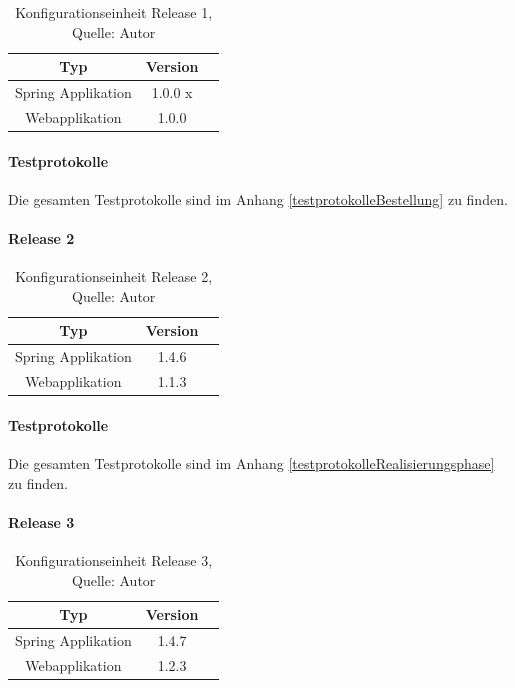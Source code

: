 \begin{table}[H]
\setlength\extrarowheight{2pt} %
\begin{tabularx}{\textwidth}{|C|C|C|}
\hline
\textbf{Typ} &  \textbf{Version}  \\
\hline
Spring Applikation & 1.0.0 x\\
\hline
Webapplikation  & 1.0.0\\

\hline
\end{tabularx}
\caption{ \label{tbl: Konfigurationseinheit Release 1}Konfigurationseinheit Release 1, Quelle: Autor}
\end{table}

\paragraph{Testprotokolle}
Die gesamten Testprotokolle sind im Anhang \ref{testprotokolleBestellung} zu finden. 

\paragraph{Release 2}

\begin{table}[H]
	\setlength\extrarowheight{2pt} %
	\begin{tabularx}{\textwidth}{|C|C|C|}
		\hline
		\textbf{Typ} &  \textbf{Version}  \\
		\hline
		Spring Applikation & 1.4.6\\
		\hline
		Webapplikation  & 1.1.3\\
		\hline
	\end{tabularx}
	\caption{ \label{tbl: Konfigurationseinheit Release 2}Konfigurationseinheit Release 2, Quelle: Autor}
\end{table}

\paragraph{Testprotokolle}
Die gesamten Testprotokolle sind im Anhang \ref{testprotokolleRealisierungsphase} zu finden. 
\paragraph{Release 3}

\begin{table}[H]
	\setlength\extrarowheight{2pt} %
	\begin{tabularx}{\textwidth}{|C|C|C|}
		\hline
		\textbf{Typ} &  \textbf{Version}  \\
		\hline
		Spring Applikation & 1.4.7\\
		\hline
		Webapplikation  & 1.2.3\\
		\hline
	\end{tabularx}
	\caption{ \label{tbl: Konfigurationseinheit Release 3}Konfigurationseinheit Release 3, Quelle: Autor}
\end{table}

